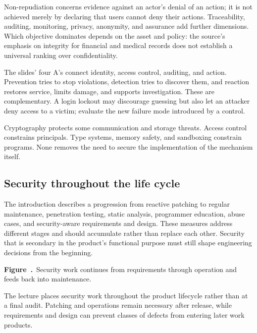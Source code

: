 \documentclass[11pt,a4paper]{article}
\numberwithin{figure}{section}
\newcommand{\diagramcaption}[1]{\par\smallskip\refstepcounter{figure}\begin{center}\small\textbf{Figure~\thefigure.}~#1\end{center}}
\begin{document}
Non-repudiation concerns evidence against an actor's denial of an action; it is not achieved merely by declaring that users cannot deny their actions. Traceability, auditing, monitoring, privacy, anonymity, and assurance add further dimensions. Which objective dominates depends on the asset and policy: the source's emphasis on integrity for financial and medical records does not establish a universal ranking over confidentiality.

The slides' four A's connect identity, access control, auditing, and action. Prevention tries to stop violations, detection tries to discover them, and reaction restores service, limits damage, and supports investigation. These are complementary. A login lockout may discourage guessing but also let an attacker deny access to a victim; evaluate the new failure mode introduced by a control.

Cryptography protects some communication and storage threats. Access control constrains principals. Type systems, memory safety, and sandboxing constrain programs. None removes the need to secure the implementation of the mechanism itself.

\subsection{Security throughout the life cycle}
The introduction describes a progression from reactive patching to regular maintenance, penetration testing, static analysis, programmer education, abuse cases, and security-aware requirements and design. These measures address different stages and should accumulate rather than replace each other. Security that is secondary in the product's functional purpose must still shape engineering decisions from the beginning.

\begin{center}\end{center}
\diagramcaption{Security work continues from requirements through operation and feeds back into maintenance.}
The lecture places security work throughout the product lifecycle rather than at a final audit. Patching and operations remain necessary after release, while requirements and design can prevent classes of defects from entering later work products.
\end{document}

